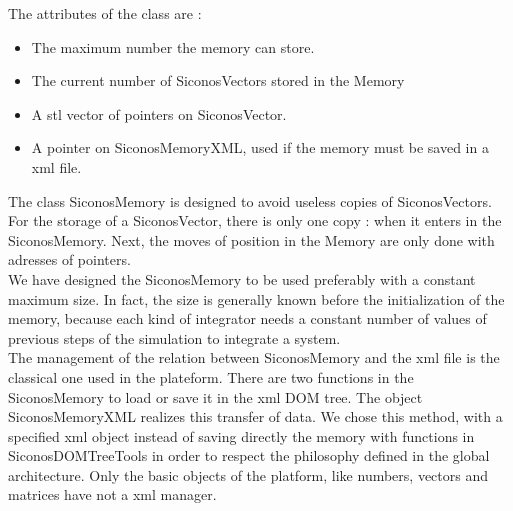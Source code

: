The attributes of the class are :
\begin{itemize}
\item The maximum number the memory can store.
\item The current number of SiconosVectors stored in the Memory
\item A \acs{stl} vector of pointers on SiconosVector.
\item A pointer on SiconosMemoryXML, used if the memory must be saved in a \ac{xml} file.
\end{itemize} 

The class SiconosMemory is designed to avoid useless copies of SiconosVectors. For the storage of a SiconosVector, there is only one copy : when it enters in the SiconosMemory. Next, the moves of position in the Memory are only done with adresses of pointers. \\
 
We have designed the SiconosMemory to be used preferably with a constant maximum size. In fact, the size is generally known before the initialization of the memory, because each kind of integrator needs a constant number of values of previous steps of the simulation to integrate a system. \\

The management of the relation between SiconosMemory and the \ac{xml} file is the classical one used in the plateform. There are two functions in the SiconosMemory to load or save it in the \ac{xml} DOM tree. The object SiconosMemoryXML realizes this transfer of data.
We chose this method, with a specified \ac{xml} object instead of saving directly the memory with functions in SiconosDOMTreeTools in order to respect the philosophy defined in the global architecture. Only the basic objects of the platform, like numbers, vectors and matrices have not a xml manager. %


